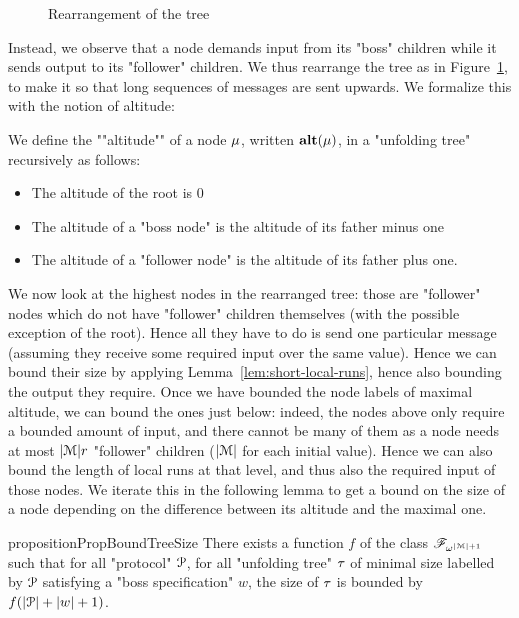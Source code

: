 \begin{figure}[h]
	
	\caption{Rearrangement of the tree}
	\label{fig:rearrange-tree}
\end{figure}


Instead, we observe that a node demands input from its "boss" children while it sends output to its "follower" children. We thus rearrange the tree as in Figure~\ref{fig:rearrange-tree}, to make it so that long sequences of messages are sent upwards. We formalize this with the notion of altitude:



\begin{definition}
	We define the ""altitude"" of a node $\mu$, written $\mathbf{alt}(\mu)$, in a "unfolding tree" recursively as follows:
	\begin{itemize}
		\item The altitude of the root is $0$
		
		\item The altitude of a "boss node" is the altitude of its father minus one
		
		\item The altitude of a "follower node" is the altitude of its father plus one.
	\end{itemize}
\end{definition}

We now look at the highest nodes in the rearranged tree: those are "follower" nodes which do not have "follower" children themselves (with the possible exception of the root). Hence all they have to do is send one particular message (assuming they receive some required input over the same value). Hence we can bound their size by applying Lemma~\ref{lem:short-local-runs}, hence also bounding the output they require.
Once we have bounded the node labels of maximal altitude, we can bound the ones just below: indeed, the nodes above only require a bounded amount of input, and there cannot be many of them as a node needs at most $|\mathcal{M}|r$ "follower" children ($|\mathcal{M}|$ for each initial value). Hence we can also bound the length of local runs at that level, and thus also the required input of those nodes.
We iterate this in the following lemma to get a bound on the size of a node depending on the difference between its altitude and the maximal one.


\begin{restatable}{proposition}{PropBoundTreeSize}
	\label{prop:bound-tree-size}
	There exists a function $f$ of the class $\mathscr{F}_{\omega^{|\mathcal{M}|+1}}$ such that for all "protocol" $\mathcal{P}$, for all "unfolding tree" $\tau$ of minimal size labelled by $\mathcal{P}$ satisfying a "boss specification" $w$, the size of $\tau$ is bounded by $f(|\mathcal{P}| + |w|+1)$.
\end{restatable}



